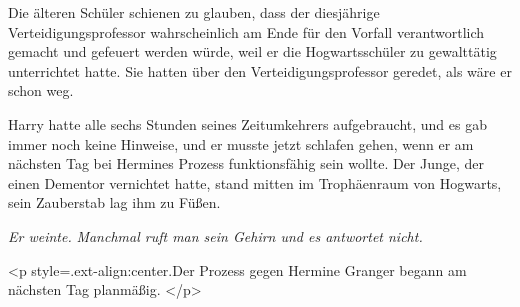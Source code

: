 Die älteren Schüler schienen zu glauben, dass der diesjährige
Verteidigungsprofessor wahrscheinlich am Ende für den Vorfall verantwortlich
gemacht und gefeuert werden würde, weil er die Hogwartsschüler zu gewalttätig
unterrichtet hatte. Sie hatten über den Verteidigungsprofessor geredet, als wäre
er schon weg.

Harry hatte alle sechs Stunden seines Zeitumkehrers aufgebraucht, und es gab
immer noch keine Hinweise, und er musste jetzt schlafen gehen, wenn er am
nächsten Tag bei Hermines Prozess funktionsfähig sein wollte. Der Junge, der
einen Dementor vernichtet hatte, stand mitten im Trophäenraum von Hogwarts, sein
Zauberstab lag ihm zu Füßen.

\emph{Er weinte.}
\emph{Manchmal ruft man sein Gehirn und es antwortet nicht. }


<p style=\grqq{}.ext-align:center\grqq{}.Der Prozess gegen Hermine Granger
begann am nächsten Tag planmäßig. </p>

